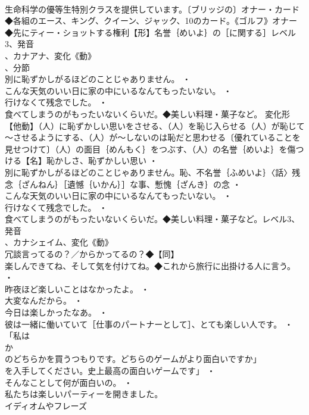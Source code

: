 \documentclass[8pt]{extreport}
\begin{document}
\begin{CJK}{UTF8}{min}
\\	生命科学の優等生特別クラスを提供しています。〔ブリッジの〕オナー・カード◆各組のエース、キング、クイーン、ジャック、10のカード。《ゴルフ》オナー◆先にティー・ショットする権利【形】名誉｛めいよ｝の［に関する］レベル3、発音
\\	、カナアナ、変化《動》
\\	、分節
\\	別に恥ずかしがるほどのことじゃありません。 ・
\\	こんな天気のいい日に家の中にいるなんてもったいない。 ・
\\	行けなくて残念でした。 ・
\\	食べてしまうのがもったいないくらいだ。◆美しい料理・菓子など。	変化形 
\\	【他動】（人）に恥ずかしい思いをさせる、（人）を恥じ入らせる（人）が恥じて～させるようにする、（人）が～しないのは恥だと思わせる〔優れていることを見せつけて〕（人）の面目｛めんもく｝をつぶす、（人）の名誉｛めいよ｝を傷つける【名】恥かしさ、恥ずかしい思い ・
\\	別に恥ずかしがるほどのことじゃありません。恥、不名誉｛ふめいよ｝〈話〉残念｛ざんねん｝［遺憾｛いかん｝］な事、慙愧｛ざんき｝の念 ・
\\	こんな天気のいい日に家の中にいるなんてもったいない。 ・
\\	行けなくて残念でした。 ・
\\	食べてしまうのがもったいないくらいだ。◆美しい料理・菓子など。レベル3、発音
\\	、カナシェイム、変化《動》
\\	冗談言ってるの？／からかってるの？◆【同】
\\	楽しんできてね、そして気を付けてね。◆これから旅行に出掛ける人に言う。 ・
\\	昨夜ほど楽しいことはなかったよ。 ・
\\	大変なんだから。 ・
\\	今日は楽しかったなあ。 ・
\\	彼は一緒に働いていて［仕事のパートナーとして］、とても楽しい人です。 ・
\\	「私は
\\	か
\\	のどちらかを買うつもりです。どちらのゲームがより面白いですか」
\\	を入手してください。史上最高の面白いゲームです」 ・
\\	そんなことして何が面白いの。 ・
\\	私たちは楽しいパーティーを開きました。
\\	イディオムやフレーズ 

\end{CJK}
\end{document}
